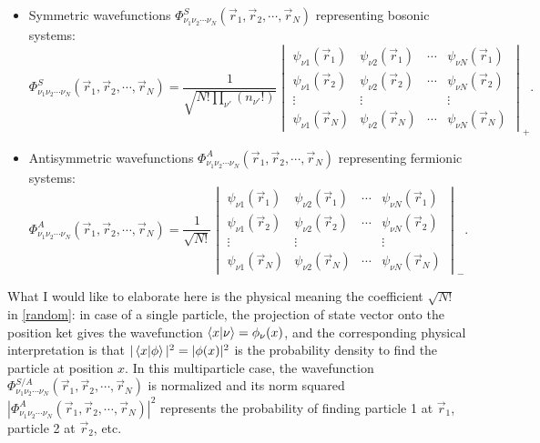 \documentclass[a4paper,12pts]{article}
\numberwithin{equation}{section}
\begin{document}
	\begin{itemize}
		\item Symmetric wavefunctions $\Phi_{\nu_1\nu_2\cdots\nu_N}^S(\vec{r}_1,\vec{r}_2,\cdots,\vec{r}_N)$ representing bosonic systems:
		\begin{equation}
		\Phi_{\nu_1\nu_2\cdots\nu_N}^S(\vec{r}_1,\vec{r}_2,\cdots,\vec{r}_N) = \frac{1}{\sqrt{N!\prod_{\nu'}(n_{\nu'}!)}}\begin{vmatrix}
		\psi_{\nu1}(\vec{r}_1) & \psi_{\nu2}(\vec{r}_1) & \cdots & \psi_{\nu N}(\vec{r}_1) \\
		\psi_{\nu1}(\vec{r}_2) & \psi_{\nu2}(\vec{r}_2) & \cdots & \psi_{\nu N}(\vec{r}_2)\\
		\vdots & \vdots & & \vdots\\
		\psi_{\nu1}(\vec{r}_N) & \psi_{\nu2}(\vec{r}_N) & \cdots & \psi_{\nu N}(\vec{r}_N)
		\end{vmatrix}_+.
		\end{equation}
		\item Antisymmetric wavefunctions
		$\Phi_{\nu_1\nu_2\cdots\nu_N}^A(\vec{r}_1,\vec{r}_2,\cdots,\vec{r}_N)$ representing fermionic systems:
		\begin{equation}
		\Phi_{\nu_1\nu_2\cdots\nu_N}^A(\vec{r}_1,\vec{r}_2,\cdots,\vec{r}_N) = \frac{1}{\sqrt{N!}}\begin{vmatrix}
		\psi_{\nu1}(\vec{r}_1) & \psi_{\nu2}(\vec{r}_1) & \cdots & \psi_{\nu N}(\vec{r}_1) \\
		\psi_{\nu1}(\vec{r}_2) & \psi_{\nu2}(\vec{r}_2) & \cdots & \psi_{\nu N}(\vec{r}_2)\\
		\vdots & \vdots & & \vdots\\
		\psi_{\nu1}(\vec{r}_N) & \psi_{\nu2}(\vec{r}_N) & \cdots & \psi_{\nu N}(\vec{r}_N)
		\end{vmatrix}_-.
		\end{equation}
	\end{itemize}
	What I would like to elaborate here is the physical meaning the coefficient $\sqrt{N!}$ in \ref{random}: in case of a single particle, the projection of state vector onto the position ket gives the wavefunction $\braket{x|\nu}=\phi_{\nu}(x)$, and the corresponding physical interpretation is that $|\braket{x|\phi}|^2=|\phi(x)|^2$ is the probability density to find the particle at position $x$. In this multiparticle case, the wavefunction $\Phi_{\nu_1\nu_2\cdots\nu_N}^{S/A}(\vec{r}_1,\vec{r}_2,\cdots,\vec{r}_N)$ is normalized and its norm squared $|\Phi_{\nu_1\nu_2\cdots\nu_N}^A(\vec{r}_1,\vec{r}_2,\cdots,\vec{r}_N)|^2$ represents the probability of finding particle 1 at $\vec{r}_1$, particle 2 at $\vec{r}_2$, etc.
\end{document}
